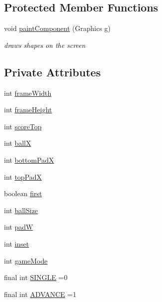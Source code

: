 \subsection*{Protected Member Functions}
\begin{DoxyCompactItemize}
\item 
void \hyperlink{classview_1_1_pong_game_display_a0e3a18dfc9bbd76c97439a618a3330ac}{paint\+Component} (Graphics g)
\begin{DoxyCompactList}\small\item\em draws shapes on the screen \end{DoxyCompactList}\end{DoxyCompactItemize}
\subsection*{Private Attributes}
\begin{DoxyCompactItemize}
\item 
int \hyperlink{classview_1_1_pong_game_display_aacbf5c26433ea74107021b461af657c1}{frame\+Width}
\item 
int \hyperlink{classview_1_1_pong_game_display_a1263ea81d63ff3e12b37fee42225a22e}{frame\+Height}
\item 
int \hyperlink{classview_1_1_pong_game_display_a14bdd6ada555582531723e7c11784251}{score\+Top}
\item 
int \hyperlink{classview_1_1_pong_game_display_aa1f518edcfa598a7ba036567eadf3ae0}{ballX}
\item 
int \hyperlink{classview_1_1_pong_game_display_a195949e482e01530f0c8c876bbf88e6a}{bottom\+PadX}
\item 
int \hyperlink{classview_1_1_pong_game_display_a808ad12c167de880ca74e5ad56ea5f43}{top\+PadX}
\item 
boolean \hyperlink{classview_1_1_pong_game_display_aeb378cbf5a0a37e9105c9748910f3513}{first}
\item 
int \hyperlink{classview_1_1_pong_game_display_ae26155e2cdf4f47b164377b7ee3ba3e4}{ball\+Size}
\item 
int \hyperlink{classview_1_1_pong_game_display_a9617cc99b5e08dc62ac3272a0934d576}{padW}
\item 
int \hyperlink{classview_1_1_pong_game_display_ac202bb5082c22fb3f40ddff2ccc797b5}{inset}
\item 
int \hyperlink{classview_1_1_pong_game_display_a38f4635d73ef3c3986ad8a351b6f7a69}{game\+Mode}
\item 
final int \hyperlink{classview_1_1_pong_game_display_a8d4dbbd4e9ba52b12ba951899c7fe02d}{S\+I\+N\+G\+LE} =0
\item 
final int \hyperlink{classview_1_1_pong_game_display_a3aa7541f41ee227f6f7c3acf0bd35871}{A\+D\+V\+A\+N\+CE} =1
\end{DoxyCompactItemize}


